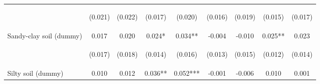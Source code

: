 \begin{center}
\begin{tabular}{lcccccccc}
\vspace{4pt} & \begin{footnotesize}(0.021)\end{footnotesize} & \begin{footnotesize}(0.022)\end{footnotesize} & \begin{footnotesize}(0.017)\end{footnotesize} & \begin{footnotesize}(0.020)\end{footnotesize} & \begin{footnotesize}(0.016)\end{footnotesize} & \begin{footnotesize}(0.019)\end{footnotesize} & \begin{footnotesize}(0.015)\end{footnotesize} & \begin{footnotesize}(0.017)\end{footnotesize} \\
Sandy-clay soil (dummy) & 0.017 & 0.020 & 0.024* & 0.034** & -0.004 & -0.010 & 0.025** & 0.023 \\
\vspace{4pt} & \begin{footnotesize}(0.017)\end{footnotesize} & \begin{footnotesize}(0.018)\end{footnotesize} & \begin{footnotesize}(0.014)\end{footnotesize} & \begin{footnotesize}(0.016)\end{footnotesize} & \begin{footnotesize}(0.013)\end{footnotesize} & \begin{footnotesize}(0.015)\end{footnotesize} & \begin{footnotesize}(0.012)\end{footnotesize} & \begin{footnotesize}(0.014)\end{footnotesize} \\
Silty soil (dummy) & 0.010 & 0.012 & 0.036** & 0.052*** & -0.001 & -0.006 & 0.010 & 0.001 \\

\end{tabular}
\end{center}
